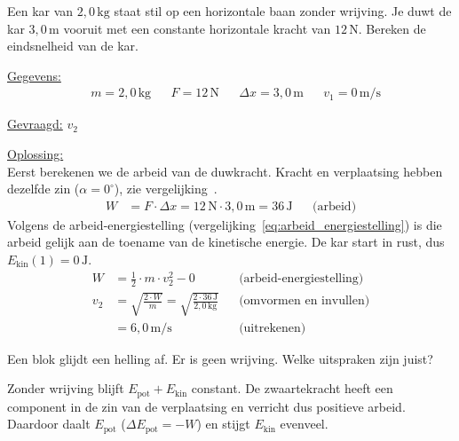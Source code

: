 \documentclass{ximera}
\begin{document}
\begin{example}[foldable=true,title={Voorbeeld: een kar versnellen}]\nl
    Een kar van $2{,}0 \, \mathrm{kg}$ staat stil op een horizontale baan zonder wrijving. Je duwt de kar $3{,}0 \, \mathrm{m}$ vooruit met een constante horizontale kracht van $12 \, \mathrm{N}$. Bereken de eindsnelheid van de kar.

    \begin{solution}\nl
        \underline{Gegevens:}
        \begin{align*}
            & m = 2{,}0 \, \mathrm{kg} & & F = 12 \, \mathrm{N} & & \Delta x = 3{,}0 \, \mathrm{m} & & v_{1} = 0 \, \mathrm{m/s}
        \end{align*}

        \underline{Gevraagd:} $v_{2}$

        \underline{Oplossing:}\\
        Eerst berekenen we de arbeid van de duwkracht. Kracht en verplaatsing hebben dezelfde zin ($\alpha = 0^\circ$), zie vergelijking~.
        \begin{align*}
            W &= F \cdot \Delta x = 12 \, \mathrm{N} \cdot 3{,}0 \, \mathrm{m} = 36 \, \mathrm{J} && \text{(arbeid)}
        \end{align*}
        Volgens de arbeid-energiestelling (vergelijking~\ref{eq:arbeid_energiestelling}) is die arbeid gelijk aan de toename van de kinetische energie. De kar start in rust, dus $E_{\text{kin}}(1) = 0 \, \mathrm{J}$.
        \begin{align*}
            W &= \frac{1}{2} \cdot m \cdot v_{2}^{2} - 0 && \text{(arbeid-energiestelling)}\\
            v_{2} &= \sqrt{\frac{2 \cdot W}{m}} = \sqrt{\frac{2 \cdot 36 \, \mathrm{J}}{2{,}0 \, \mathrm{kg}}} && \text{(omvormen en invullen)}\\
            &= \boxed{6{,}0 \, \mathrm{m/s}} && \text{(uitrekenen)}
        \end{align*}
    \end{solution}
\end{example}

\begin{question}
    Een blok glijdt een helling af. Er is geen wrijving. Welke uitspraken zijn juist?

    \begin{selectAll}
    \end{selectAll}

    \begin{solution}\nl
        Zonder wrijving blijft $E_{\text{pot}} + E_{\text{kin}}$ constant. De zwaartekracht heeft een component in de zin van de verplaatsing en verricht dus positieve arbeid. Daardoor daalt $E_{\text{pot}}$ ($\Delta E_{\text{pot}} = -W$) en stijgt $E_{\text{kin}}$ evenveel.
    \end{solution}
\end{question}
\end{document}
